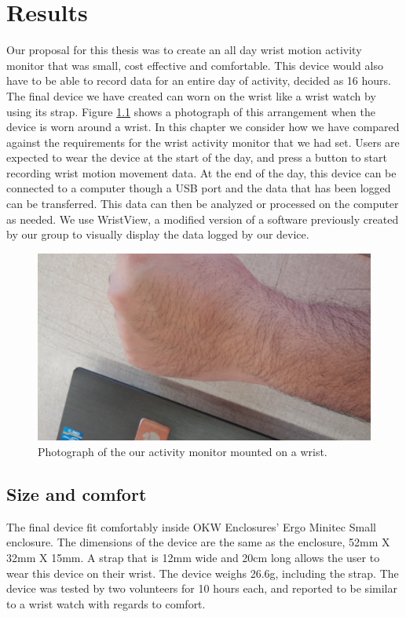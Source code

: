 \chapter{Results}
\label{Chap:Results}

Our proposal for this thesis was to create an all day wrist motion activity monitor
that was small, cost effective and comfortable.
This device would also have to be able to record data for an entire day of activity,
decided as 16 hours.
The final device we have created can worn on the wrist like a wrist watch by using its strap.
Figure \ref{Fig:WristPhoto} shows a photograph of this arrangement when the device is worn around a wrist.
In this chapter we consider how we have compared against the requirements for the wrist activity monitor that we had set.
Users are expected to wear the device at the start of the day,
and press a button to start recording wrist motion movement data.
At the end of the day,
this device can be connected to a computer though a USB port and the data that has been logged can be transferred.
This data can then be analyzed or processed on the computer as needed.
We use WristView, a modified version of a software previously created by our group to visually display the data logged by our device. 
\begin{figure}
\begin{center}
\includegraphics[width=\textwidth]{images/WristPhoto.jpg}
\caption{Photograph of the our activity monitor mounted on a wrist.}
\label{Fig:WristPhoto}
\end{center}
\end{figure}

\section{Size and comfort}
\label{Sec:ResultsSize}
The final device fit comfortably inside OKW Enclosures' Ergo Minitec Small enclosure.
The dimensions of the device are the same as the enclosure,
52mm X 32mm X 15mm.
A strap that is 12mm wide and 20cm long allows the user to wear this device on their wrist.
The device weighs 26.6g, including the strap.
The device was tested by two volunteers for 10 hours each,
and reported to be similar to a wrist watch with regards to comfort.

